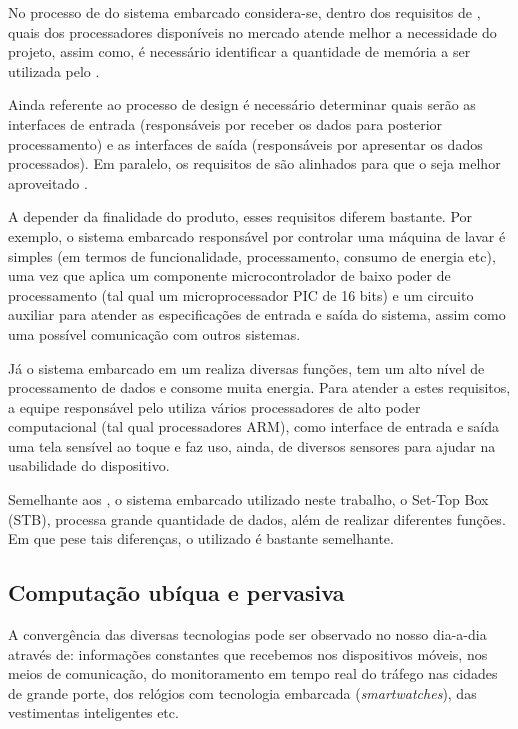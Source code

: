 No processo de \design[] do sistema embarcado considera-se, dentro dos
requisitos de \hardware, quais dos processadores disponíveis no mercado atende
melhor a necessidade do projeto, assim como, é necessário identificar a
quantidade de memória a ser utilizada pelo \software[]. 

Ainda referente ao processo de design é necessário determinar quais serão as
interfaces de entrada (responsáveis por receber os dados para posterior
processamento) e as interfaces de saída (responsáveis por apresentar os dados
processados). Em paralelo, os requisitos de \software[] são alinhados para que o
\hardware[] seja melhor aproveitado \cite{wolf2012computers}.

A depender da finalidade do produto, esses requisitos diferem bastante. Por
exemplo, o sistema embarcado responsável por controlar uma máquina de lavar é
simples (em termos de funcionalidade, processamento, consumo de energia etc),
uma vez que aplica um componente microcontrolador de baixo poder de
processamento (tal qual um microprocessador PIC de 16 bits) e um circuito
auxiliar para atender as especificações de entrada e saída do sistema, assim
como uma possível comunicação com outros sistemas.

Já o sistema embarcado em um \smartphone[] realiza diversas funções, tem um
alto nível de processamento de dados e consome muita energia. Para atender a
estes requisitos, a equipe responsável pelo \design[] utiliza vários
processadores de alto poder computacional (tal qual processadores ARM), como
interface de entrada e saída uma tela sensível ao toque e faz uso, ainda, de
diversos sensores para ajudar na usabilidade do dispositivo.

Semelhante aos \smartphones, o sistema embarcado utilizado neste trabalho, o
Set-Top Box (STB), processa grande quantidade de dados, além de realizar
diferentes funções. Em que pese tais diferenças, o \hardware[] utilizado é
bastante semelhante.

\subsection{Computação ubíqua e pervasiva}\label{subsec:computacao}

A convergência das diversas tecnologias pode ser observado no nosso dia-a-dia
através de: informações constantes que recebemos nos dispositivos móveis, nos
meios de comunicação, do monitoramento em tempo real do tráfego nas cidades de
grande porte, dos relógios com tecnologia embarcada (\textit{smartwatches}), das
vestimentas inteligentes etc.


